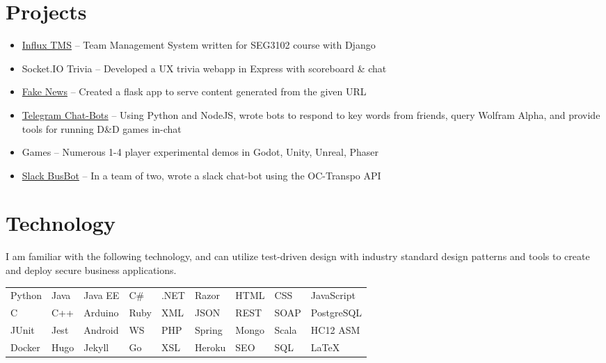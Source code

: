 \documentclass[]{rcf_cv}
\begin{document}
	


	
	\section{Projects}
		\begin{itemize}
			\setlength\itemsep{-0.4em}
			\renewcommand\labelitemi{--}
			
			\item \href{https://github.com/RyanFleck/Influx}{Influx TMS} -- Team Management System written for SEG3102 course with Django
			
			\item Socket.IO Trivia -- Developed a UX trivia webapp in Express with scoreboard \& chat
			
			\item \href{https://github.com/RyanFleck/Fake-News}{Fake News} -- Created a flask app to serve content generated from the given URL
			
			\item \href{https://github.com/RyanFleck/Telegram-Dungeon}{Telegram Chat-Bots} -- Using Python and NodeJS, wrote bots to respond to key words from friends, query Wolfram Alpha, and provide tools for running D\&D games in-chat
			
			\item Games -- Numerous 1-4 player experimental demos in Godot, Unity, Unreal, Phaser
			
			\item \href{https://github.com/morch028/BusBot}{Slack BusBot} -- In a team of two, wrote a slack chat-bot using the OC-Transpo API
			

			
		\end{itemize}

	\section{Technology}
	
		I am familiar with the following technology, and can utilize test-driven design with industry standard design patterns and tools to create and deploy secure business applications.\\
	
	\begin{tabular}{l l l l l l l l l}
		Python & Java & Java EE & C\# & .NET & Razor & HTML & CSS & JavaScript\\
		
		C & C++ & Arduino & Ruby & XML & JSON & REST & SOAP & PostgreSQL\\
		
		JUnit & Jest & Android & WS & PHP & Spring & Mongo & Scala &  HC12 ASM\\
		
		Docker & Hugo & Jekyll & Go & XSL & Heroku & SEO & SQL & \LaTeX
		
	\end{tabular}
	
\end{document}
